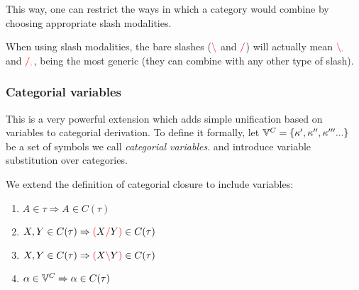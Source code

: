 \documentclass[main.tex]{subfiles}
\begin{document}
This way, one can restrict the ways in which a category would
combine by choosing appropriate slash modalities.

When using slash modalities, the bare slashes ($\textcolor{red}{\backslash}$ and $\textcolor{red}{/}$) will actually
mean $\textcolor{red}{\backslash_{.}}$ and $\textcolor{red}{/_{.}}$, being the most generic (they
can combine with any other type of slash).


\subsubsection{Categorial variables}
\label{hack:catvars}
This is a very powerful extension which adds simple unification based on variables
to categorial derivation. To define it formally, let $\mathbb{V}^{C} = \{ \kappa', \kappa'', \kappa''' ...\}$
be a set of symbols we call \emph{categorial variables}.
and introduce variable substitution over categories.

\begin{defn}
    We extend the definition of categorial closure to include variables:
    \begin{enumerate}
        \item \label{cvar:atomic} $A \in \tau \Rightarrow A \in C(\tau)$
        \item \label{cvar:right}  $X, Y \in C(\tau) \Rightarrow \textcolor{red}{(} X \textcolor{red}{/} Y \textcolor{red}{)} \in C(\tau)$
        \item \label{cvar:left}   $X, Y \in C(\tau) \Rightarrow \textcolor{red}{(} X \textcolor{red}{\backslash} Y \textcolor{red}{)} \in C(\tau)$
        \item \label{cvar:var}    $\alpha \in \mathbb{V}^{C} \Rightarrow \alpha \in C(\tau)$
    \end{enumerate}
\end{defn}
\end{document}
